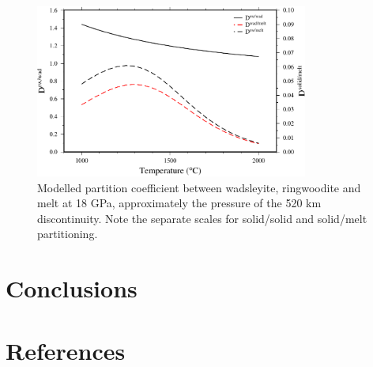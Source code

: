 \documentclass[review]{elsarticle}
\begin{document}
\begin{figure}[ht!]
  \centering
  \includegraphics[width=0.8\textwidth]{figures/rw_wad_partitioning_520}
  \caption{Modelled partition coefficient between wadsleyite, ringwoodite and melt at 18 GPa, approximately the pressure of the 520 km discontinuity. Note the separate scales for solid/solid and solid/melt partitioning.}
  \label{fig:partitioning_rw_wad}
\end{figure}

\section{Conclusions}



\clearpage
\section*{References}


\end{document}
